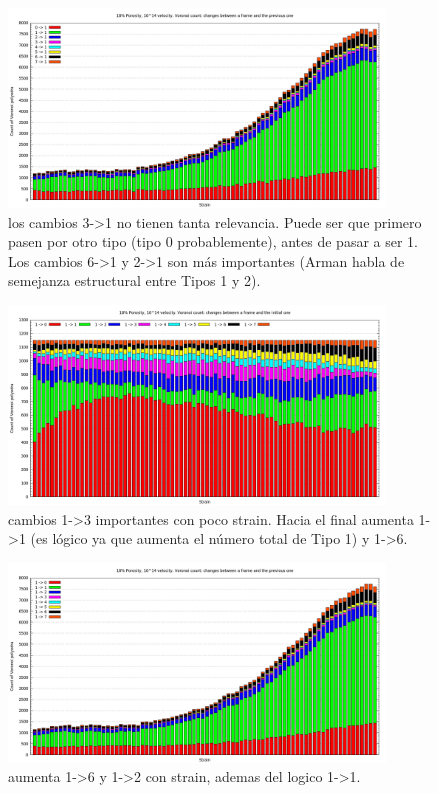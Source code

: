 \documentclass[10pt, oneside]{article} %
\begin{document}
\begin{figure}[H]
\centering
\includegraphics[width=10cm]{Figures/Porosidad_2vel_comp_voronoi_hist2.png}
\caption{los cambios 3->1 no tienen tanta relevancia. Puede ser que primero pasen por otro tipo (tipo 0 probablemente), antes de pasar a ser 1.  Los cambios 6->1 y 2->1 son más importantes (Arman habla de semejanza estructural entre Tipos 1 y 2).}
\end{figure}

\begin{figure}[H]
\centering
\includegraphics[width=10cm]{Figures/Porosidad_2vel_comp_voronoi_hist3.png}
\caption{cambios 1->3 importantes con poco strain. Hacia el final aumenta 1->1 (es lógico ya que aumenta el número total de Tipo 1) y 1->6.}
\label{fg:12comp}
\end{figure}

\begin{figure}[H]
\centering
\includegraphics[width=10cm]{Figures/Porosidad_2vel_comp_voronoi_hist4.png}
\caption{aumenta 1->6 y 1->2 con strain, ademas del logico 1->1.}
\end{figure}
\end{document}
